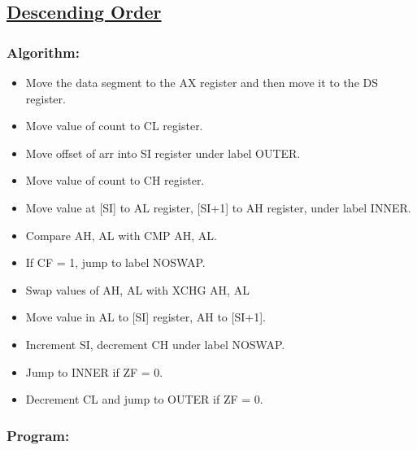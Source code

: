 \documentclass[10pt,a4paper]{article}
\begin{document}
\begin{flushleft}
\subsection*{\textbf{\underline{Descending Order}}}

\subsubsection*{\textbf{Algorithm:}}
\begin{itemize}
    \item Move the data segment to the AX register and then move it to the DS register.
    \item Move value of count to CL register.
    \item Move offset of arr into SI register under label OUTER.
    \item Move value of count to CH register.
    \item Move value at [SI] to AL register, [SI+1] to AH register, under label INNER.
    \item Compare AH, AL with CMP AH, AL.
    \item If CF = 1, jump to label NOSWAP. 
    \item Swap values of AH, AL with XCHG AH, AL
    \item Move value in AL to [SI] register, AH to [SI+1].
    \item Increment SI, decrement CH under label NOSWAP.
    \item Jump to INNER if ZF = 0.
    \item Decrement CL and jump to OUTER if ZF = 0.
\end{itemize}

\newpage
\subsubsection*{\textbf{Program:}}


\end{flushleft}
\end{document}
